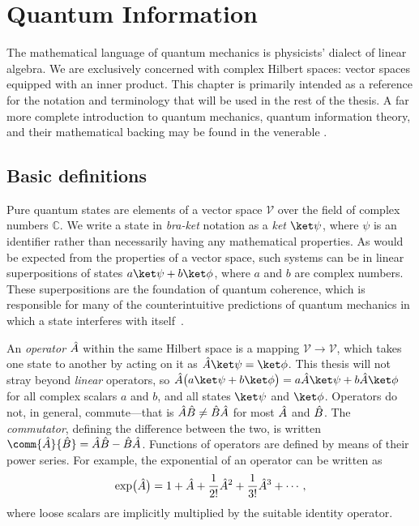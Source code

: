 \chapter{Quantum Information}
\label{sec:qi}

The mathematical language of quantum mechanics is physicists' dialect of linear algebra.
We are exclusively concerned with complex Hilbert spaces: vector spaces equipped with an inner product.
This chapter is primarily intended as a reference for the notation and terminology that will be used in the rest of the thesis.
A far more complete introduction to quantum mechanics, quantum information theory, and their mathematical backing may be found in the venerable \citet{Nielsen2010}.

\section{Basic definitions}
\label{sec:qi-basic-definitions}

Pure quantum states are elements of a vector space $\mathcal V$ over the field of complex numbers $\mathbb C$.
We write a state in \emph{bra-ket} notation as a \emph{ket} $\ket \psi$, where $\psi$ is an identifier rather than necessarily having any mathematical properties.
As would be expected from the properties of a vector space, such systems can be in linear superpositions of states $a\ket\psi + b\ket\phi$, where $a$ and $b$ are complex numbers.
These superpositions are the foundation of quantum coherence, which is responsible for many of the counterintuitive predictions of quantum mechanics in which a state interferes with itself~\cite{Hong1987}.

An \emph{operator} $\hat{A}$ within the same Hilbert space is a mapping $\mathcal V\to\mathcal V$, which takes one state to another by acting on it as $\op A\ket\psi = \ket\phi$.
This thesis will not stray beyond \emph{linear} operators, so $\op A\bigl(a\ket\psi + b\ket\phi\bigr) = a\op A\ket\psi + b\op A\ket\phi$ for all complex scalars $a$ and $b$, and all states $\ket\psi$ and $\ket\phi$.
Operators do not, in general, commute---that is $\hat{A}\hat{B} \ne \hat{B}\hat{A}$ for most $\hat{A}$ and $\hat{B}$.
The \emph{commutator}, defining the difference between the two, is written $\comm{\op A}{\op B} = \op A\op B - \op B\op A$.
Functions of operators are defined by means of their power series.
For example, the exponential of an operator can be written as
\begin{equation}
\exp\bigl(\hat{A}\bigr) = 1 + \hat{A} + \frac1{2!} \hat{A}^2 + \frac1{3!} \hat{A}^3 + \dotsb,
\end{equation}
where loose scalars are implicitly multiplied by the suitable identity operator.

